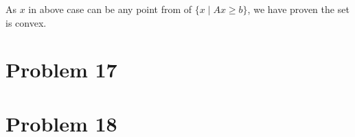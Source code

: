 \documentclass[12pt]{article}
\begin{document}
As $x$ in above case can be any point from of $\{x \mid Ax \geq b \}$, we have proven the set is convex.

\section{Problem 17}

\section{Problem 18}


% 
% 
\end{document}
